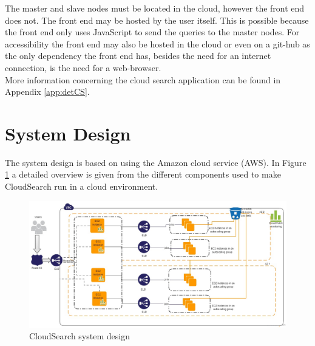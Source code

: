 \documentclass{acm_proc_article-sp}
\begin{document}
The master and slave nodes must be located in the cloud, however the front end does not.
The front end may be hosted by the user itself.
This is possible because the front end only uses JavaScript to send the queries to the master nodes.
For accessibility the front end may also be hosted in the cloud or even on a git-hub as the only dependency the front end has, besides the need for an internet connection, is the need for a web-browser.\\
More information concerning the cloud search application can be found in Appendix \ref{app:detCS}.

\section{System Design}
The system design is based on using the Amazon cloud service (AWS).
In Figure \ref{fig:detailed} a detailed overview is given from the different components used to make CloudSearch run in a cloud environment.

\begin{figure}[ht!]
\centering
\includegraphics[scale=0.5, angle=90]{CloudSearchDetailed.jpg}
\caption{CloudSearch system design \label{fig:detailed}}
\end{figure}
\end{document}
